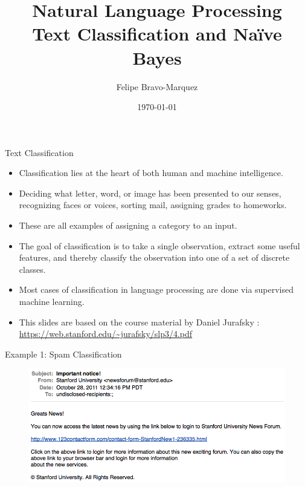 \documentclass[handout]{beamer}
\title{Natural Language Processing \\ Text Classification and Naïve Bayes}
\author[Felipe Bravo Márquez]{\footnotesize
 \textcolor[rgb]{0.00,0.00,1.00}{Felipe Bravo-Marquez}}
\date{\today}
\begin{document}
\begin{frame}
\titlepage


\end{frame}


\begin{frame}{Text Classification}
    \scriptsize
    \begin{itemize}
        \item Classification lies at the heart of both human and machine intelligence. 
        \item Deciding what letter, word, or image has been presented to our senses, recognizing faces or voices, sorting mail, assigning grades to homeworks.
        \item These are all examples of assigning a category to an input.
        \item The goal of classification is to take a single observation, extract some useful features, and thereby classify the observation into one of a set of discrete classes.
        \item  Most cases of classification in language processing are done via supervised machine learning. 
        \item This slides are based on the course material by Daniel Jurafsky : \url{https://web.stanford.edu/~jurafsky/slp3/4.pdf} 
    \end{itemize}   
\end{frame}


\begin{frame}{Example 1: Spam Classification}

\begin{figure}[h]
\includegraphics[scale = 0.35]{pics/spam.png}
\end{figure}


\end{frame}
\end{document}
